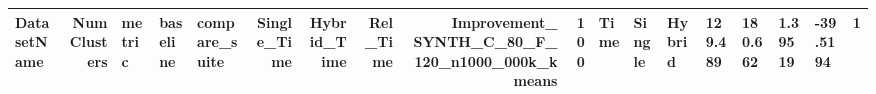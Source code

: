 \begin{tabular}{lrlllrrrrr}
\toprule
DatasetName & NumClusters & metric & baseline & compare_suite & Single_Time & Hybrid_Time & Rel_Time & Improvement_%
\midrule
SYNTH_C_80_F_120_n1000_000k_kmeans & 100 & Time & Single & Hybrid & 129.489 & 180.662 & 1.39519 & -39.5194 & 1 \\
\bottomrule
\end{tabular}
